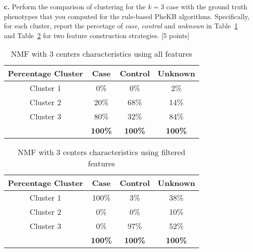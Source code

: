 \documentclass[12pt]{article}
\begin{document}
\textbf{c.} Perform the comparison of clustering for the $k=3$ case with the ground truth phenotypes that you computed for the rule-based PheKB algorithms. Specifically, for each cluster, report the percetage of \textit{case}, \textit{control} and \textit{unknown} in Table~\ref{tbl:nmfall} and Table~\ref{tbl:nmffiltered} for two feature construction strategies. [5 points]


\begin{table}[!h]
\centering
\begin{tabular}{ c | c | c | c }
  \hline
  Percentage Cluster & Case & Control & Unknown\\
  \hline
  Cluster 1 & 0\% & 0\% & 2\% \\
  Cluster 2 & 20\% & 68\% & 14\% \\
  Cluster 3 & 80\% & 32\% & 84\% \\
  \hline
   & \bf{100\%} & \bf{100\%} & \bf{100\%} \\
  \hline
\end{tabular}
\caption{NMF with 3 centers characteristics using all features}
\label{tbl:nmfall}
\end{table}
\begin{table}[!h]
\centering
\begin{tabular}{ c | c | c | c }
  \hline
  Percentage Cluster & Case & Control & Unknown\\
  \hline
  Cluster 1 & 100\% & 3\% & 38\% \\
  Cluster 2 & 0\% & 0\% & 10\% \\
  Cluster 3 & 0\% & 97\% & 52\% \\
  \hline
   & \bf{100\%} & \bf{100\%} & \bf{100\%} \\
  \hline
\end{tabular}
\caption{NMF with 3 centers characteristics using filtered features}
\label{tbl:nmffiltered}
\end{table}
\end{document}
